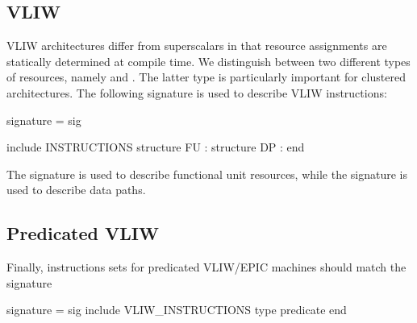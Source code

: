 \subsection{VLIW}
   VLIW architectures differ from superscalars in that
resource assignments are statically determined at compile time.
We distinguish between two different types of resources, namely
 and .  
The latter type is particularly
important for clustered architectures.
The following signature
is used to describe VLIW instructions:
\begin{SML}
signature  =
sig

   include INSTRUCTIONS
   structure FU : 
   structure DP : 
end
\end{SML}
The signature  is used to describe functional unit
resources, while the signature  is used to describe
data paths.

\subsection{Predicated VLIW}

Finally, instructions sets for predicated VLIW/EPIC machines should match
the signature 
\begin{SML}
signature  =
sig
   include VLIW_INSTRUCTIONS
   type predicate
end
\end{SML}
